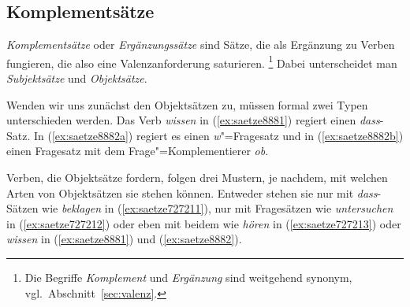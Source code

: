 \subsection{Komplementsätze}

\label{sec:komplementsaetze}

\textit{Komplementsätze} oder \textit{Ergänzungssätze} sind Sätze, die als Ergänzung zu Verben fungieren, die also eine Valenzanforderung saturieren.%
\footnote{Die Begriffe \textit{Komplement} und \textit{Ergänzung} sind weitgehend synonym, vgl.\ Abschnitt~\ref{sec:valenz}.}
Dabei unterscheidet man \textit{Subjektsätze} und \textit{Objektsätze}.


Wenden wir uns zunächst den Objektsätzen zu, müssen formal zwei Typen unterschieden werden.
Das Verb \textit{wissen} in (\ref{ex:saetze8881}) regiert einen \textit{dass}-Satz.
In (\ref{ex:saetze8882a}) regiert es einen \textit{w}"=Fragesatz und in (\ref{ex:saetze8882b}) einen Fragesatz mit dem Frage"=Komplementierer \textit{ob}.

\begin{exe}
  \ex\label{ex:saetze8882}
  \begin{xlist}
  \end{xlist}
\end{exe}

Verben, die Objektsätze fordern, folgen drei Mustern, je nachdem, mit welchen Arten von Objektsätzen sie stehen können.
Entweder stehen sie nur mit \textit{dass}-Sätzen wie \textit{beklagen} in (\ref{ex:saetze727211}), nur mit Fragesätzen wie \textit{untersuchen} in (\ref{ex:saetze727212}) oder eben mit beidem wie \textit{hören} in (\ref{ex:saetze727213}) oder \textit{wissen} in (\ref{ex:saetze8881}) und (\ref{ex:saetze8882}).

